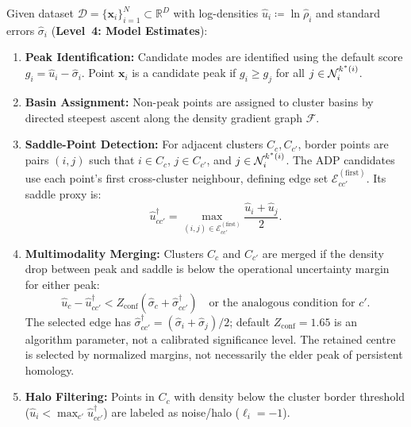 Given dataset $\mathcal{D} = \{\mathbf{x}_i\}_{i=1}^N \subset
\mathbb{R}^D$ with \pak{} log-densities $\hat{u}_i \coloneqq \ln
\hat{\rho}_i$ and standard errors $\hat{\sigma}_i$ (\textbf{Level~4:
Model Estimates}):
\begin{enumerate}[noitemsep,topsep=2pt]
  \item \textbf{Peak Identification:} Candidate modes are identified
    using the default score $g_i=\hat u_i-\hat\sigma_i$. Point
    $\mathbf{x}_i$ is a
    candidate peak if $g_i \ge g_j$ for all $j \in \mathcal{N}_i^{k^{*}(i)}$.
  \item \textbf{Basin Assignment:} Non-peak points are assigned to
    cluster basins by directed steepest ascent along the density
    gradient graph $\mathcal{F}$.
  \item \textbf{Saddle-Point Detection:} For adjacent clusters $C_c,
    C_{c'}$, border points are pairs $(i, j)$ such that $i \in C_c$,
    $j \in C_{c'}$, and $j \in \mathcal{N}_i^{k^{*}(i)}$. The
    ADP candidates use each point's first cross-cluster neighbour,
    defining edge set $\mathcal E_{cc'}^{(\mathrm{first})}$. Its
    saddle proxy is:
    \begin{equation}
      \hat u_{cc'}^\dagger=
      \max_{(i,j)\in\mathcal E_{cc'}^{(\mathrm{first})}}
      \frac{\hat u_i+\hat u_j}{2}.
      \label{eq:saddle_density_def}
    \end{equation}
  \item \textbf{Multimodality Merging:} Clusters $C_c$ and $C_{c'}$
    are merged if the density drop between peak and saddle is
    below the operational uncertainty margin for either peak:
    \begin{equation}
      \hat u_c-\hat u_{cc'}^\dagger
      <Z_{\mathrm{conf}}(\hat\sigma_c+\hat\sigma_{cc'}^\dagger)
      \quad\text{or the analogous condition for }c'.
      \label{eq:merge_condition}
    \end{equation}
    The selected edge has $\hat\sigma_{cc'}^\dagger
    =(\hat\sigma_i+\hat\sigma_j)/2$; default $Z_{\mathrm{conf}}=1.65$
    is an algorithm parameter, not a calibrated significance level.
    The retained centre is selected by normalized margins, not
    necessarily the elder peak of persistent homology.
  \item \textbf{Halo Filtering:} Points in $C_c$ with density below
    the cluster border threshold ($\hat{u}_i < \max_{c'}
    \hat{u}_{cc'}^\dagger$) are labeled as noise/halo
    ($\ell_i = -1$).
\end{enumerate}

